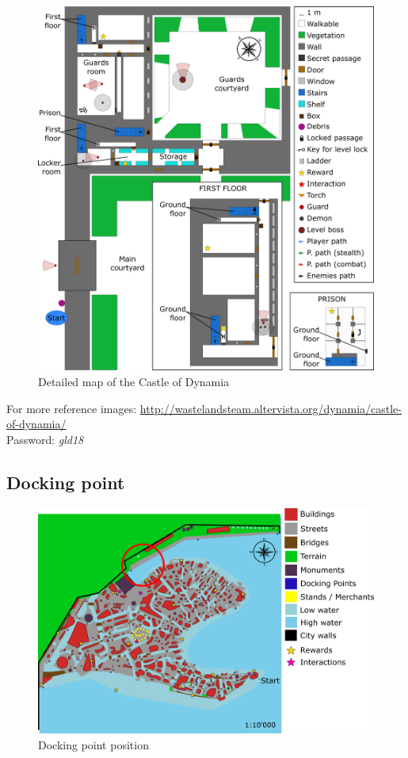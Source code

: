 \begin{figure}[H]
  \centering
  \includegraphics[width=\textwidth]{Images/Maps/castleOfDynamia}
  \caption{Detailed map of the Castle of Dynamia}
\end{figure}

For more reference images: \url{http://wastelandsteam.altervista.org/dynamia/castle-of-dynamia/}\\
Password: \textit{gld18}

\subsection{Docking point}
\begin{figure}[H]
  \centering
  \includegraphics[width=12cm]{Images/Maps/dynamia_dockingPoint}
  \caption{Docking point position}
\end{figure}
  
